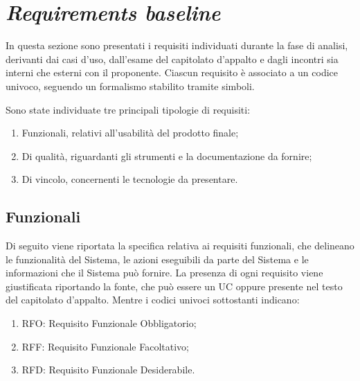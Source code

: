 \section{\textit{Requirements baseline}}

In questa sezione sono presentati i requisiti individuati durante la fase di analisi, derivanti dai casi d'uso, dall'esame del capitolato d'appalto e dagli incontri
sia interni che esterni con il proponente. Ciascun requisito è associato a un codice univoco, seguendo un formalismo stabilito tramite simboli.

Sono state individuate tre principali tipologie di requisiti:
\begin{enumerate}
	\item Funzionali, relativi all'usabilità del prodotto finale;
	\item Di qualità, riguardanti gli strumenti e la documentazione da fornire;
	\item Di vincolo, concernenti le tecnologie da presentare.
\end{enumerate}

\subsection{Funzionali}

Di seguito viene riportata la specifica relativa ai requisiti funzionali, che delineano le funzionalità del Sistema, le azioni eseguibili
da parte del Sistema e le informazioni che il Sistema può fornire. La presenza di ogni requisito viene giustificata riportando la fonte, che può essere un UC oppure presente
nel testo del capitolato d'appalto. Mentre i codici univoci sottostanti indicano:
\begin{enumerate}
	\item RFO: Requisito Funzionale Obbligatorio;
	\item RFF: Requisito Funzionale Facoltativo;
	\item RFD: Requisito Funzionale Desiderabile.
\end{enumerate}


